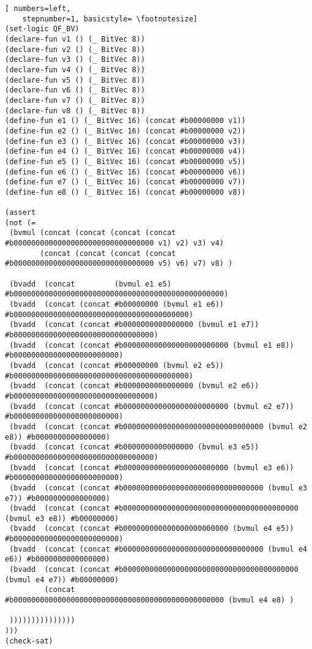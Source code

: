 \begin{lstlisting}[ numbers=left,
    stepnumber=1, basicstyle= \footnotesize]
(set-logic QF_BV)
(declare-fun v1 () (_ BitVec 8))
(declare-fun v2 () (_ BitVec 8))
(declare-fun v3 () (_ BitVec 8))
(declare-fun v4 () (_ BitVec 8))
(declare-fun v5 () (_ BitVec 8))
(declare-fun v6 () (_ BitVec 8))
(declare-fun v7 () (_ BitVec 8))
(declare-fun v8 () (_ BitVec 8))
(define-fun e1 () (_ BitVec 16) (concat #b00000000 v1))
(define-fun e2 () (_ BitVec 16) (concat #b00000000 v2))
(define-fun e3 () (_ BitVec 16) (concat #b00000000 v3))
(define-fun e4 () (_ BitVec 16) (concat #b00000000 v4))
(define-fun e5 () (_ BitVec 16) (concat #b00000000 v5))
(define-fun e6 () (_ BitVec 16) (concat #b00000000 v6))
(define-fun e7 () (_ BitVec 16) (concat #b00000000 v7))
(define-fun e8 () (_ BitVec 16) (concat #b00000000 v8))

(assert
(not (=
 (bvmul (concat (concat (concat (concat #b00000000000000000000000000000000 v1) v2) v3) v4)
        (concat (concat (concat (concat #b00000000000000000000000000000000 v5) v6) v7) v8) )

 (bvadd  (concat         (bvmul e1 e5)     #b000000000000000000000000000000000000000000000000)
 (bvadd  (concat (concat #b00000000 (bvmul e1 e6)) #b0000000000000000000000000000000000000000)
 (bvadd  (concat (concat #b0000000000000000 (bvmul e1 e7)) #b00000000000000000000000000000000)
 (bvadd  (concat (concat #b000000000000000000000000 (bvmul e1 e8)) #b000000000000000000000000)
 (bvadd  (concat (concat #b00000000 (bvmul e2 e5)) #b0000000000000000000000000000000000000000)
 (bvadd  (concat (concat #b0000000000000000 (bvmul e2 e6)) #b00000000000000000000000000000000)
 (bvadd  (concat (concat #b000000000000000000000000 (bvmul e2 e7)) #b000000000000000000000000)
 (bvadd  (concat (concat #b00000000000000000000000000000000 (bvmul e2 e8)) #b0000000000000000)
 (bvadd  (concat (concat #b0000000000000000 (bvmul e3 e5)) #b00000000000000000000000000000000)
 (bvadd  (concat (concat #b000000000000000000000000 (bvmul e3 e6)) #b000000000000000000000000)
 (bvadd  (concat (concat #b00000000000000000000000000000000 (bvmul e3 e7)) #b0000000000000000)
 (bvadd  (concat (concat #b0000000000000000000000000000000000000000 (bvmul e3 e8)) #b00000000)
 (bvadd  (concat (concat #b000000000000000000000000 (bvmul e4 e5)) #b000000000000000000000000)
 (bvadd  (concat (concat #b00000000000000000000000000000000 (bvmul e4 e6)) #b0000000000000000)
 (bvadd  (concat (concat #b0000000000000000000000000000000000000000 (bvmul e4 e7)) #b00000000)
         (concat         #b000000000000000000000000000000000000000000000000 (bvmul e4 e8) )

 )))))))))))))))
)))
(check-sat)
\end{lstlisting}

